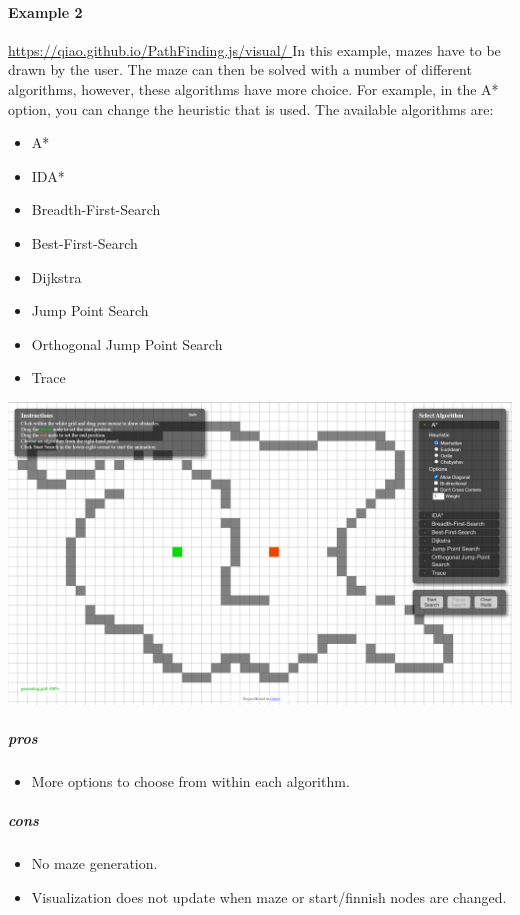 \documentclass[titlepage]{article}
\begin{document}
\paragraph{Example 2}
\href{https://qiao.github.io/PathFinding.js/visual/
}{https://qiao.github.io/PathFinding.js/visual/
}
\newline
In this example, mazes have to be drawn by the user. The maze can then be solved with a number of different algorithms, however, these algorithms have more choice. For example, in the A* option, you can change the heuristic that is used. The available algorithms are:
\begin{itemize}
    \item A*
    \item IDA*
    \item Breadth-First-Search
    \item Best-First-Search
    \item Dijkstra
    \item Jump Point Search
    \item Orthogonal Jump Point Search
    \item Trace
\end{itemize}
\includegraphics[width=\linewidth]{assets/Existing Solutions/example 2.PNG}
\subparagraph*{pros}
\begin{itemize}
    \item More options to choose from within each algorithm.
\end{itemize}
\subparagraph*{cons}
\begin{itemize}
    \item No maze generation.
    \item Visualization does not update when maze or start/finnish nodes are changed.
\end{itemize}
\end{document}
